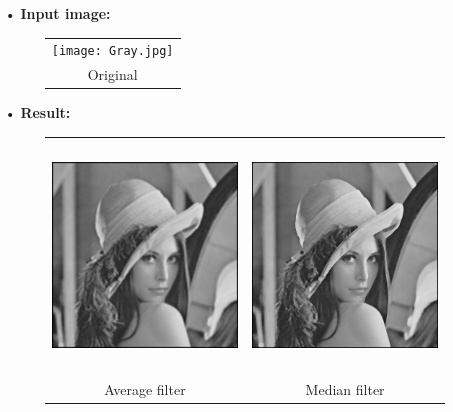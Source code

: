 \documentclass[12pt,a4paper]{article}
\begin{document}
\begin{enumerate}
\begin{lstlisting}
\end{lstlisting}

\item[•]
{\bf Input image:}\\
\begin{figure}[h]
\hspace*{11em}
\begin{tabular}{c}
\texttt{[image: Gray.jpg]}\\
Original
\end{tabular}
\end{figure}

\item[•]
{\bf Result:}
\begin{figure}[h]
\hspace*{3em}
\begin{tabular}{cc}
\includegraphics[height=2.4in]{average_filter.jpg}&
\includegraphics[height=2.4in]{median_filter.jpg}\\
Average filter  & Median filter \vspace*{2em}\\
\end{tabular}
\end{figure} 


\end{enumerate}
\end{document}
